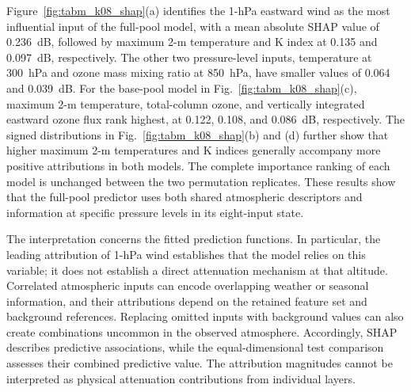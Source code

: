 Figure~\ref{fig:tabm_k08_shap}(a) identifies the 1-hPa
eastward wind as the most influential input of the
full-pool model, with a mean absolute SHAP value of
0.236~dB, followed by maximum 2-m temperature and
K index at 0.135 and 0.097~dB, respectively.
The other two pressure-level inputs, temperature at
300~hPa and ozone mass mixing ratio at 850~hPa,
have smaller values of 0.064 and 0.039~dB.
For the base-pool model in Fig.~\ref{fig:tabm_k08_shap}(c),
maximum 2-m temperature, total-column ozone, and
vertically integrated eastward ozone flux rank highest,
at 0.122, 0.108, and 0.086~dB, respectively.
The signed distributions in Fig.~\ref{fig:tabm_k08_shap}(b)
and (d) further show that higher maximum 2-m temperatures
and K indices generally accompany more positive
attributions in both models.
The complete importance ranking of each model is
unchanged between the two permutation replicates.
These results show that the full-pool predictor uses
both shared atmospheric descriptors and information
at specific pressure levels in its eight-input state.

The interpretation concerns the fitted prediction
functions. In particular, the leading attribution of
1-hPa wind establishes that the model relies on this
variable; it does not establish a direct attenuation
mechanism at that altitude.
Correlated atmospheric inputs can encode overlapping
weather or seasonal information, and their attributions
depend on the retained feature set and background
references. Replacing omitted inputs with background
values can also create combinations uncommon in the
observed atmosphere.
Accordingly, SHAP describes predictive associations,
while the equal-dimensional test comparison assesses
their combined predictive value. The attribution
magnitudes cannot be interpreted as physical
attenuation contributions from individual layers.
